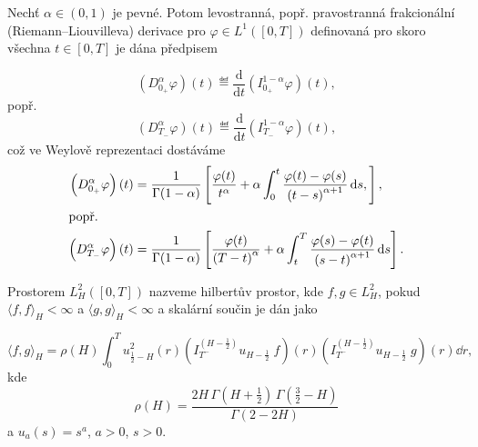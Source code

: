 \begin{definice}\label{def:fracder}
    Nechť $\alpha\in \left( 0,1 \right)$ je pevné. Potom levostranná, popř.
    pravostranná frakcionální (Riemann--Liouvilleva) derivace pro
    $\varphi\in L^1 \left( \left[ 0,T \right] \right)$ definovaná pro skoro
    všechna $t\in\left[ 0,T \right]$ je dána předpisem
        
        $$\left( D_{0_+}^\alpha \varphi \right) \left( t \right) \eqdef
        \frac{\mathrm{d}}{\mathrm{d}t}\left( I_{0_+}^{1-\alpha} \varphi \right) \left( t \right) ,$$
    popř.
        $$\left( D_{T_-}^\alpha \varphi \right) \left( t \right) \eqdef
        \frac{\mathrm{d}}{\mathrm{d}t}\left( I_{T_-}^{1-\alpha} \varphi \right) \left( t \right) ,$$
    což ve Weylově reprezentaci dostáváme
\begin{align*}
    \left( D_{0_+}^\alpha \varphi \right) \left( t \right) &=
        \frac{1}{\Gamma(1-\alpha)}\left[ \frac{\varphi(t)}{t^\alpha} + \alpha
        \int_{0}^{t} \frac{\varphi(t)-\varphi(s)}{\left(t-s\right)^{\alpha+1}} 
        \,\mathrm{d} s, \right],\\
    \intertext{popř.}
    \left( D_{T_-}^\alpha \varphi \right) \left( t \right) &=
        \frac{1}{\Gamma(1-\alpha)}\left[ \frac{\varphi(t)}{\left( T-t
        \right)^\alpha} + \alpha \int_{t}^{T} \frac{\varphi(s)-\varphi(t)}{\left(s-t\right)^{\alpha+1}} 
        \,\mathrm{d} s \right].
\end{align*}
\end{definice}




\begin{definice}
    Prostorem $L^2_H \left( \left[ 0,T \right] \right)$ nazveme hilbertův
    prostor, kde $f,g\in L^2_H$, pokud $\langle f,f \rangle_H < \infty$ a
    $\langle g,g \rangle_H < \infty$ a skalární součin je dán jako

    $$ \langle f,g \rangle_H = \rho (H) \int_0^T u_{\frac{1}{2}-H}^2 (r)
    \left(I_{T^-}^{\left(H-\frac{1}{2}\right)} u_{H-\frac{1}{2}}\; f \right) (r)
    \left(I_{T^-}^{\left(H-\frac{1}{2}\right)} u_{H-\frac{1}{2}}\; g \right)
    (r) \dd r, $$
    kde 
    $$ \rho (H) = \frac{2H \, \Gamma (H+\frac{1}{2}) \, \Gamma(\frac{3}{2}-H)}
    {\Gamma (2-2H)}$$
    a $u_a (s) = s^a$, $a>0$, $s>0$.

\end{definice}


